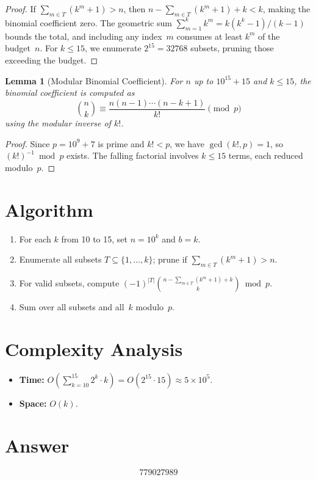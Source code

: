 \documentclass[11pt]{article}
\newtheorem{lemma}[theorem]{Lemma}
\begin{document}
\begin{proof}
If $\sum_{m \in T}(k^m+1) > n$, then $n - \sum_{m \in T}(k^m+1) + k < k$, making the binomial coefficient zero. The geometric sum $\sum_{m=1}^{k} k^m = k(k^k-1)/(k-1)$ bounds the total, and including any index~$m$ consumes at least $k^m$ of the budget~$n$. For $k \le 15$, we enumerate $2^{15} = 32768$ subsets, pruning those exceeding the budget.
\end{proof}

\begin{lemma}[Modular Binomial Coefficient]
For $n$ up to $10^{15}+15$ and $k \le 15$, the binomial coefficient is computed as
\[
\binom{n}{k} \equiv \frac{n(n-1)\cdots(n-k+1)}{k!} \pmod{p}
\]
using the modular inverse of $k!$.
\end{lemma}

\begin{proof}
Since $p = 10^9+7$ is prime and $k! < p$, we have $\gcd(k!,p)=1$, so $(k!)^{-1} \bmod p$ exists. The falling factorial involves $k \le 15$ terms, each reduced modulo~$p$.
\end{proof}

\section{Algorithm}

\begin{enumerate}
    \item For each $k$ from 10 to 15, set $n = 10^k$ and $b = k$.
    \item Enumerate all subsets $T \subseteq \{1,\ldots,k\}$; prune if $\sum_{m \in T}(k^m+1) > n$.
    \item For valid subsets, compute $(-1)^{|T|}\binom{n - \sum_{m\in T}(k^m+1)+k}{k} \bmod p$.
    \item Sum over all subsets and all~$k$ modulo~$p$.
\end{enumerate}

\section{Complexity Analysis}
\begin{itemize}
    \item \textbf{Time:} $O\!\left(\sum_{k=10}^{15} 2^k \cdot k\right) = O(2^{15} \cdot 15) \approx 5 \times 10^5$.
    \item \textbf{Space:} $O(k)$.
\end{itemize}

\section{Answer}

\[
\boxed{779027989}
\]
\end{document}
